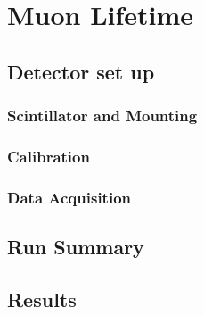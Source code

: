 \section{Muon Lifetime} %
\label{sec:muon_lifetime}
\subsection{Detector set up} %
\label{sub:lifetime_detector_set_up}
\subsubsection{Scintillator and Mounting} %
\label{ssub:lifetime_scintillator_mounting}

\subsubsection{Calibration} %
\label{ssub:lifetime_calibration}

\subsubsection{Data Acquisition} %
\label{ssub:lifetime_data_acquisition}

\subsection{Run Summary} %
\label{sub:lifetime_run_summary}

\subsection{Results} %
\label{sub:lifetime_results}

